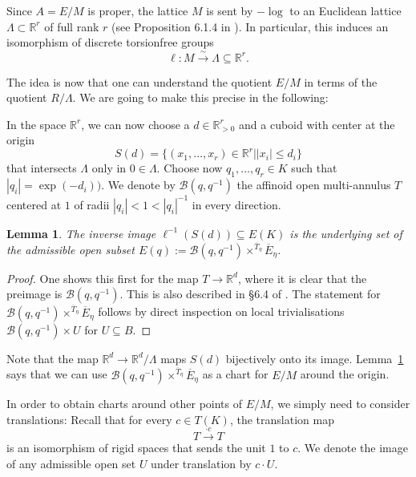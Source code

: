 \documentclass[11pt,oneside]{amsart}
\newtheorem{lemma}[theorem]{Lemma}
\theoremstyle{definition}
\theoremstyle{remark}
\begin{document}
	Since $A=E/M$ is proper, the lattice $M$ is sent by $-\log$ to an Euclidean lattice $\Lambda \subset \mathbb R^r$ of full rank $r$ (see Proposition 6.1.4 in \cite{rigid geometry of curves}). In particular, this induces an isomorphism of discrete torsionfree groups
	\[\ell:M\xrightarrow{\sim} \Lambda\subseteq\mathbb R^r.\]
	
	The idea is now that one can understand the quotient $E/M$ in terms of the quotient $R/\Lambda$. We are going to make this precise in the following:
	
	In the space $\mathbb R^r$, we can now choose a $d\in \mathbb R_{> 0}^r$ and a cuboid with center at the origin
	\[S(d) = \{(x_1,\dots,x_r)\in \mathbb R^r | |x_i|\leq d_i \}\]
	that intersects $\Lambda$ only in $0\in \Lambda$.
	Choose now $q_1,\dots,q_r\in K$ such that $|q_i|=\exp(-d_i))$. We denote by $\mathcal B(q,q^{-1})$ the affinoid open multi-annulus $T$ centered at $1$ of radii $|q_i|< 1 < |q_i|^{-1}$ in every direction.
	
	\begin{lemma}\label{cube around origin gives local chart for E/M}
		The inverse image $\ell^{-1}(S(d))\subseteq E(K)$ is the underlying set of the admissible open subset $E(q):=\mathcal B(q,q^{-1})\times^{\overline{T}_\eta}\overline{E}_\eta$.
	\end{lemma}
	\begin{proof}
		One shows this first for the map $T\rightarrow \mathbb R^d$, where it is clear that the preimage is $\mathcal B(q,q^{-1})$. This is also described in \S 6.4 of \cite{FvdP}. The statement for $\mathcal B(q,q^{-1})\times^{\overline{T}_\eta}\overline{E}_\eta$ follows by direct inspection on local trivialisations $\mathcal B(q,q^{-1})\times U$ for $U\subseteq B$.
	\end{proof}
	
	
	Note that the map $\mathbb R^d\rightarrow \mathbb R^d/\Lambda$ maps $S(d)$ bijectively onto its image. 
	Lemma~\ref{cube around origin gives local chart for E/M} says that we can use $\mathcal B(q,q^{-1})\times^{\overline{T}_\eta}\overline{E}_\eta$ as a chart for $E/M$ around the origin.
	
	In order to obtain charts around other points of $E/M$, we simply need to consider translations: Recall that for every $c\in T(K)$, the translation map
	\[T\xrightarrow{\cdot c}T\]
	is an isomorphism of rigid spaces that sends the unit $1$ to $c$. We denote the image of any admissible open set $U$ under translation by $c\cdot U$.
	
\end{document}
